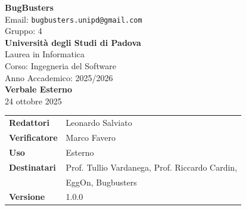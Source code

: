 \documentclass[a4paper,12pt]{article}
\begin{document}
\begin{center}  
  
  {\Large\bfseries\color{primaryblue} BugBusters}\\[0.3cm]
  {\small\color{darkgray} Email: \texttt{bugbusters.unipd@gmail.com}} \\[0.1cm]
  {\small\color{darkgray} Gruppo: 4} \\[0.5cm]

  {\large\bfseries Università degli Studi di Padova}\\[0.3cm]
  {\small Laurea in Informatica}\\[0.2cm]
  {\small Corso: Ingegneria del Software}\\[0.2cm]
  {\small Anno Accademico: 2025/2026}\\[0.8cm]

  {\Huge\bfseries\color{primaryblue} Verbale Esterno}\\[0.3cm]
  {\Large\color{secondaryblue} 24 ottobre 2025}\\[0.8cm]
\end{center}

\begin{center}
\begin{tcolorbox}[colback=lightgray,colframe=primaryblue,width=0.85\textwidth,arc=3mm,boxrule=0.5pt]
\begin{tabular}{@{}ll@{}}
\textbf{Redattori}    & Leonardo Salviato \\
\textbf{Verificatore}    & Marco Favero \\
\textbf{Uso}          & Esterno \\
\textbf{Destinatari}  & Prof. Tullio Vardanega, Prof. Riccardo Cardin,\\ & EggOn, Bugbusters \\
\textbf{Versione} & 1.0.0\\

\end{tabular}
\end{tcolorbox}
\end{center}
\end{document}
